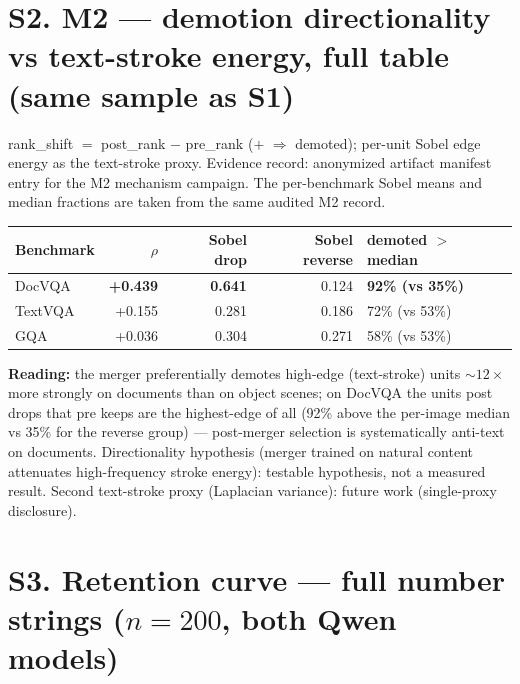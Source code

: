 \documentclass[journal]{IEEEtran}
\begin{document}
\section*{S2. M2 --- demotion directionality vs text-stroke energy, full table (same sample as S1)}

rank\_shift $=$ post\_rank $-$ pre\_rank ($+$ $\Rightarrow$ demoted); per-unit
Sobel edge energy as the text-stroke proxy. Evidence record: anonymized artifact
manifest entry for the M2 mechanism campaign. The per-benchmark Sobel means
and median fractions are taken from the same audited M2 record.

\begin{table}[ht]
  \centering
  \scriptsize
  \setlength{\tabcolsep}{2pt}
  \begin{tabular}{@{}l r r r l@{}}
    \toprule
    Benchmark & $\rho$ & Sobel drop & Sobel reverse & demoted $>$ median \\
    \midrule
    DocVQA  & \textbf{+0.439} & \textbf{0.641} & 0.124 & \textbf{92\% (vs 35\%)} \\
    TextVQA & +0.155          & 0.281          & 0.186 & 72\% (vs 53\%) \\
    GQA     & +0.036          & 0.304          & 0.271 & 58\% (vs 53\%) \\
    \bottomrule
  \end{tabular}
\end{table}

\noindent\textbf{Reading:} the merger preferentially demotes high-edge
(text-stroke) units ${\sim}12\times$ more strongly on documents than on object
scenes; on DocVQA the units post drops that pre keeps are the highest-edge of
all (92\% above the per-image median vs 35\% for the reverse group) ---
post-merger selection is systematically anti-text on documents. Directionality
hypothesis (merger trained on natural content attenuates high-frequency stroke
energy): testable hypothesis, not a measured result. Second text-stroke proxy
(Laplacian variance): future work (single-proxy disclosure).

\section*{S3. Retention curve --- full number strings ($n = 200$, both Qwen models)}
\end{document}
